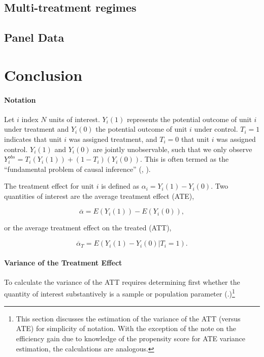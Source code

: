\documentclass[11pt,titlepage]{article}
\begin{document}
\subsection{Multi-treatment regimes}
\subsection{Panel Data}
\section{Conclusion}

\paragraph{Notation} 
Let $i$ index $N$ units of interest. $Y_i(1)$ represents the potential
outcome of unit $i$ under treatment and $Y_i(0)$ the potential outcome
of unit $i$ under control.  $T_i=1$ indicates that unit $i$ was
assigned treatment, and $T_i=0$ that unit $i$ was assigned control.  
$Y_i(1)$ and $Y_i(0)$ are jointly unobservable, such that we only
observe $Y_i^{obs}=T_i(Y_i(1))+(1-T_i)(Y_i(0))$.  This is often termed
as the ``fundamental problem of causal inference''
(\citealt[p. 947]{holland86}, \citealt[p. 79]{KinKeoVer94}).  

The treatment effect for unit $i$ is defined as $\alpha_i = Y_i(1) - Y_i(0)$.
Two quantities of interest are the average treatment effect (ATE),

\begin{equation}
\overline{\alpha}  =  E(Y_i(1))-E(Y_i(0)),
\end{equation}

or the average treatment effect on the treated (ATT),

\begin{equation}
\overline{\alpha}_T =  E(Y_i(1) - Y_i(0) | T_i=1). 
\end{equation}

\paragraph{Variance of the Treatment Effect}
To calculate the variance of the ATT requires determining first 
whether the quantity of interest substantively is a sample or
population parameter (\citealt[pp. 28-29]{ImbensNDb}.)\footnote{This section
  discusses the estimation of the variance of the ATT (versus ATE) for simplicity
  of notation.  With the exception of the note on the efficiency gain
  due to knowledge of the propensity score for ATE variance
  estimation, the calculations are analogous.}
\end{document}
